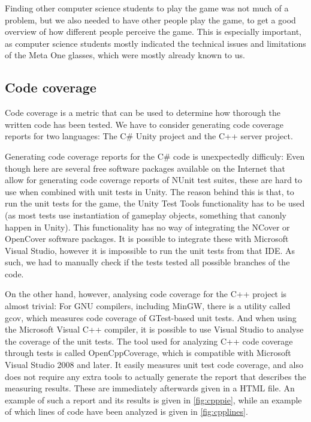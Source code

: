 			Finding other computer science students to play the game was not much of 
			a problem, but we also needed to have other people play the game, to get 
			a good overview of how different people perceive the game. This is
			especially important, as computer science students mostly indicated the 
			technical issues and limitations of the Meta One glasses, which were mostly
			already known to us.
			
		
		\subsection{Code coverage} \label{ssec:codecoverage}
			Code coverage is a metric that can be used to determine how thorough
			the written code has been tested. We have to consider generating 
            code coverage reports for two languages: The C\# Unity project and 
            the C++ server project. 
            
            Generating code coverage reports for the C\# code is unexpectedly 
            difficuly: Even though here are several free software packages 
            available on the Internet that allow for generating code
			coverage reports of NUnit test suites, these are hard to use when 
            combined with unit tests in Unity. The reason behind this is that, 
            to run the unit tests for the game, the Unity Test Tools 
            functionality has to be used (as most tests use instantiation of 
            gameplay objects, something that canonly happen in Unity). This 
            functionality has no way of integrating the NCover or OpenCover 
            software packages. It is possible to integrate these with Microsoft 
            Visual Studio, however it is impossible to run the unit tests from 
            that IDE. As such, we had to manually check if the tests tested all 
            possible branches of the code.
            
            On the other hand, however, analysing code coverage for the C++ 
            project is almost trivial: For GNU compilers, including MinGW, 
            there is a utility called gcov, which measures code coverage of 
            GTest-based unit tests. And when using the Microsoft Visual C++ 
            compiler, it is possible to use Visual Studio to analyse the 
            coverage of the unit tests. The tool used for analyzing C++
            code coverage through tests is called OpenCppCoverage, which
            is compatible with Microsoft Visual Studio 2008 and later.
            It easily measures unit test code coverage, and also does not
            require any extra tools to actually generate the report that
            describes the measuring results. These are immediately afterwards
            given in a HTML file. An example of such a report and its results
            is given in \ref{fig:cpppie}, while an example of which lines of code have
            been analyzed is given in \ref{fig:cpplines}.
            
